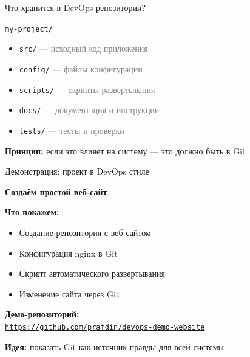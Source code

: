 \documentclass[aspectratio=169]{beamer}
\begin{document}
    \begin{frame}{Что хранится в DevOps репозитории?}
        \begin{center}
            \large
            \texttt{my-project/}
        \end{center}

        \begin{itemize}
            \item \texttt{src/} \textcolor{gray}{— исходный код приложения}
            \item \texttt{config/} \textcolor{gray}{— файлы конфигурации}
            \item \texttt{scripts/} \textcolor{gray}{— скрипты развертывания}
            \item \texttt{docs/} \textcolor{gray}{— документация и инструкции}
            \item \texttt{tests/} \textcolor{gray}{— тесты и проверки}
        \end{itemize}

        \vspace{0.5cm}

        \textbf{Принцип:} если это влияет на систему — это должно быть в Git
    \end{frame}

    \begin{frame}{Демонстрация: проект в DevOps стиле}
        \begin{center}
            \large
            \textbf{Создаём простой веб-сайт}
        \end{center}
        
        \vspace{0.2cm}
        
        \textbf{Что покажем:}
        \begin{itemize}
            \item Создание репозитория с веб-сайтом
            \item Конфигурация nginx в Git
            \item Скрипт автоматического развертывания
            \item Изменение сайта через Git
        \end{itemize}
        
        \vspace{0.2cm}
        
        \textbf{Демо-репозиторий:} \\
        \href{https://github.com/prafdin/devops-demo-website}{\texttt{https://github.com/prafdin/devops-demo-website}}
        
        \vspace{0.2cm}
        
        \textbf{Идея:} показать Git как источник правды для всей системы
    \end{frame}
\end{document}
